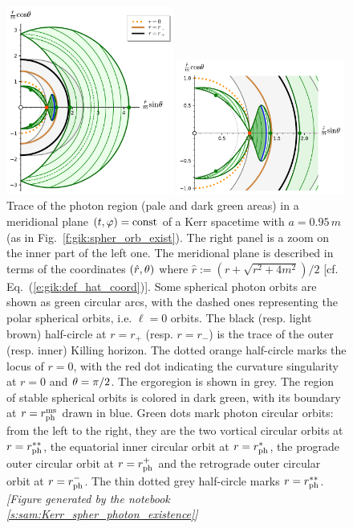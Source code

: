 \begin{figure}
\parbox[c]{0.49\textwidth}{\includegraphics[width=0.49\textwidth]{gik_spo_meridional.pdf}}
\parbox[c]{0.49\textwidth}{\includegraphics[width=0.49\textwidth]{gik_spo_meridional_zoom.pdf}}
\caption[]{\label{f:gik:spo_meridional} \footnotesize
Trace of the photon region (pale and dark green areas) in
a meridional plane $(t,\varphi)=\mathrm{const}$ of
a Kerr spacetime with $a = 0.95\, m$ (as in Fig.~\ref{f:gik:spher_orb_exist}).
The right panel is a zoom on the inner part of the left one.
The meridional plane is described in terms of the coordinates $(\hat{r},\theta)$
where $\hat{r} := (r + \sqrt{r^2 + 4m^2})/2$ [cf. Eq.~(\ref{e:gik:def_hat_coord})].
Some spherical photon orbits are shown as green circular arcs,
with the dashed ones representing the polar spherical orbits, i.e. $\ell=0$ orbits.
The black (resp. light brown) half-circle at $r=r_+$ (resp. $r=r_-$)
is the trace of the outer (resp. inner) Killing horizon.
The dotted orange half-circle marks the locus of $r=0$, with the
red dot indicating the curvature singularity at $r=0$ and $\theta=\pi/2$.
The ergoregion is shown in grey. The region of stable spherical orbits is
colored in dark green, with its boundary at $r=r_{\rm ph}^{\rm ms}$ drawn in blue.
Green dots mark photon circular orbits: from the left to the right, they
are the two vortical circular orbits at $r=r_{\rm ph}^{**}$, the equatorial
inner circular orbit at $r=r_{\rm ph}^*$, the prograde outer circular orbit
at $r=r_{\rm ph}^+$ and the retrograde outer circular orbit at $r=r_{\rm ph}^-$.
The thin dotted grey half-circle marks $r=r_{\rm ph}^{**}$.
\textsl{[Figure generated by the notebook \ref{s:sam:Kerr_spher_photon_existence}]}
}
\end{figure}


